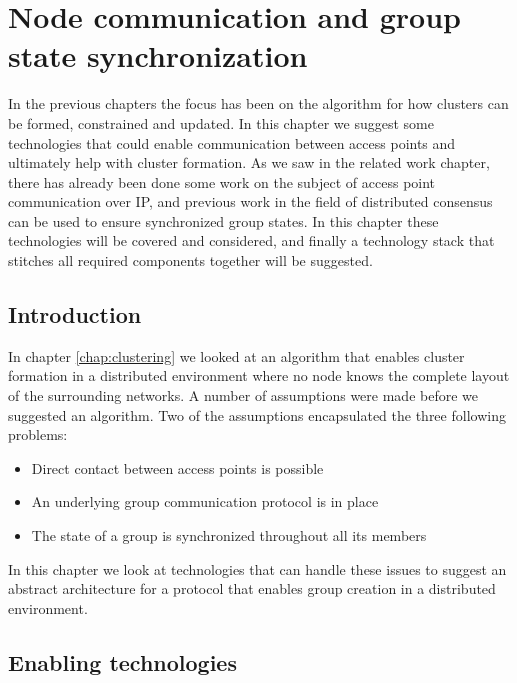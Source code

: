 \chapter{Node communication and group state synchronization}
\label{chap:proto}
In the previous chapters the focus has been on the algorithm for how clusters can be formed, constrained and updated. In this chapter we suggest some technologies
that could enable communication between access points and ultimately help with cluster formation. As we saw in the related work chapter, there
has already been done some work on the subject of access point communication over IP, and previous work in the field of distributed consensus can be used to ensure synchronized group states.
In this chapter these technologies will be covered and considered, and finally a technology stack that stitches all required components together will be suggested. 


\section{Introduction}
In chapter \ref{chap:clustering} we looked at an algorithm that enables cluster formation in a distributed environment where no node knows the complete layout of the surrounding networks.
A number of assumptions were made before we suggested an algorithm. Two of the assumptions encapsulated the three following problems:
\begin{itemize}
\item Direct contact between access points is possible
\item An underlying group communication protocol is in place
\item The state of a group is synchronized throughout all its members
\end{itemize}
In this chapter we look at technologies that can handle these issues to suggest an abstract architecture for a protocol that enables group creation in a distributed environment.

\section{Enabling technologies}
